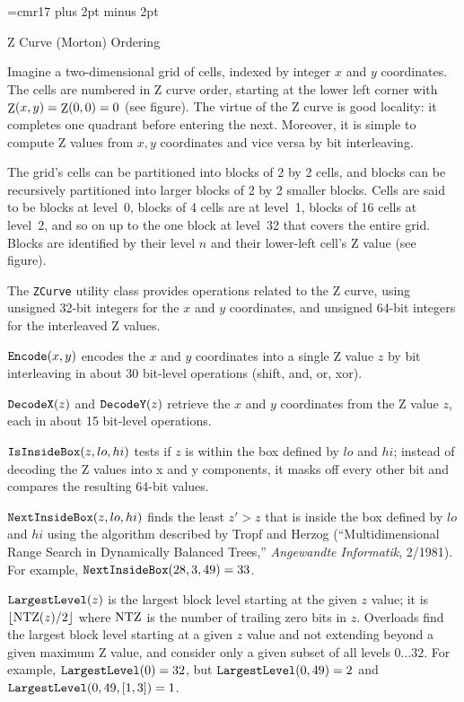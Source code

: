
\magnification\magstephalf
\nopagenumbers
\font\tf=cmr17
\parindent=0pt
\parskip=6pt plus 2pt minus 2pt
\def\Z{\mathop{\rm Z}}%

\centerline{\tf Z Curve (Morton) Ordering}
\bigskip
\noindent
Imagine a two-dimensional grid of cells, indexed by integer
$x$ and $y$ coordinates. The cells are numbered in Z curve
order, starting at the lower left corner with $\Z(x,y)=\Z(0,0)=0$
(see figure). The virtue of the Z curve is good locality:
it completes one quadrant before entering the next. Moreover,
it is simple to compute Z values from $x,y$ coordinates and
vice versa by bit interleaving.

The grid's cells can be partitioned into blocks of 2 by 2 cells,
and blocks can be recursively partitioned into larger blocks of
2 by 2 smaller blocks. Cells are said to be blocks at level~0,
blocks of 4 cells are at level~1, blocks of 16 cells at level~2,
and so on up to the one block at level~32 that covers the entire
grid. Blocks are identified by their level $n$ and their lower-left
cell's Z value (see figure).

\nobreak\bigskip
\centerline{}
\medbreak
\noindent
The {\tt ZCurve} utility class provides operations related
to the Z curve, using unsigned 32-bit integers for the
$x$ and $y$ coordinates, and unsigned 64-bit integers
for the interleaved Z values.

$\hbox{\tt Encode}(x,y)$ encodes the $x$ and $y$ coordinates
into a single Z value $z$ by bit interleaving in about
30 bit-level operations (shift, and, or, xor).

$\hbox{\tt DecodeX}(z)$ and $\hbox{\tt DecodeY}(z)$ retrieve
the $x$ and $y$ coordinates from the Z value $z$, each
in about 15 bit-level operations.

$\hbox{\tt IsInsideBox}(z,lo,hi)$ tests if $z$ is within the box
defined by $lo$ and $hi$; instead of decoding the Z values
into x and y components, it masks off every other bit and
compares the resulting 64-bit values.

$\hbox{\tt NextInsideBox}(z,lo,hi)$ finds the least $z'>z$ that
is inside the box defined by $lo$ and $hi$ using the algorithm
described by Tropf and Herzog (``Multidimensional Range Search in
Dynamically Balanced Trees,'' {\sl Angewandte Informatik}, 2/1981).
For example, $\hbox{\tt NextInsideBox}(28,3,49)=33$.

$\hbox{\tt LargestLevel}(z)$ is the largest block level starting
at the given $z$ value; it is $\lfloor\hbox{NTZ}(z)/2\rfloor$
where $\hbox{NTZ}$ is the number of trailing zero bits in $z$.
Overloads find the largest block level starting at a given
$z$ value and not extending beyond a given maximum Z value,
and consider only a given subset of all levels $0\dots32$.
For example, $\hbox{\tt LargestLevel}(0)=32$, but
$\hbox{\tt LargestLevel}(0,49)=2$ and
$\hbox{\tt LargestLevel}(0,49,[1,3])=1$.


